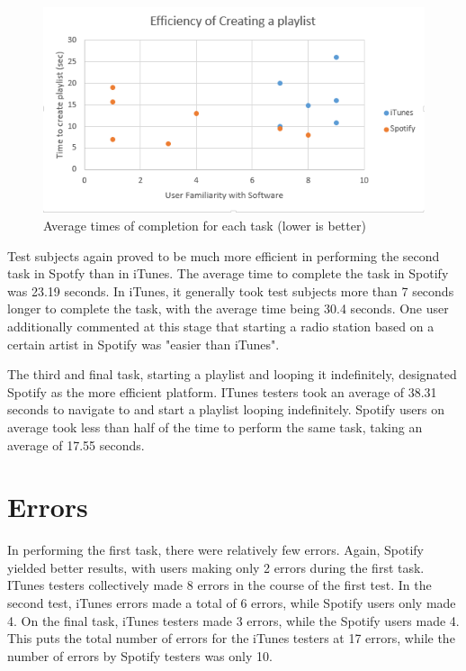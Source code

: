 \documentclass[12pt]{report}
\begin{document}
\begin{figure}[h]
	\includegraphics[width=\textwidth]{chart1.png}
	\caption{Average times of completion for each task (lower is better)}
\end{figure}

Test subjects again proved to be much more efficient in performing the second task in Spotfy than in iTunes. The average time to complete the task in Spotify was 23.19 seconds. In iTunes, it generally took test subjects more than 7 seconds longer to complete the task, with the average time being 30.4 seconds. One user additionally commented at this stage that starting a radio station based on a certain artist in Spotify was "easier than iTunes".

The third and final task, starting a playlist and looping it indefinitely, designated Spotify as the more efficient platform. ITunes testers took an average of 38.31 seconds to navigate to and start a playlist looping indefinitely. Spotify users on average took less than half of the time to perform the same task, taking an average of 17.55 seconds.

\section{Errors}

In performing the first task, there were relatively few errors. Again, Spotify yielded better results, with users making only 2 errors during the first task. ITunes testers collectively made 8 errors in the course of the first test. In the second test, iTunes errors made a total of 6 errors, while Spotify users only made 4. On the final task, iTunes testers made 3 errors, while the Spotify users made 4. This puts the total number of errors for the iTunes testers at 17 errors, while the number of errors by Spotify testers was only 10.
\end{document}
